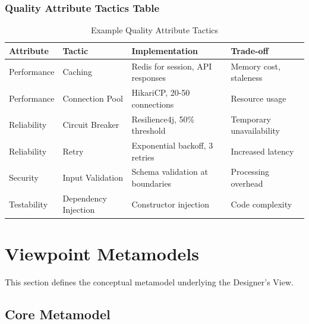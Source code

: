 \documentclass[11pt,letterpaper]{article}
\begin{document}
\subsubsection{Quality Attribute Tactics Table}

\begin{table}[H]
\centering
\caption{Example Quality Attribute Tactics}
\small
\begin{tabular}{@{}L{2cm}L{2.5cm}L{4cm}L{3.5cm}@{}}
\toprule
\textbf{Attribute} & \textbf{Tactic} & \textbf{Implementation} & \textbf{Trade-off} \\
\midrule
Performance & Caching & Redis for session, API responses & Memory cost, staleness \\
\addlinespace
Performance & Connection Pool & HikariCP, 20-50 connections & Resource usage \\
\addlinespace
Reliability & Circuit Breaker & Resilience4j, 50\% threshold & Temporary unavailability \\
\addlinespace
Reliability & Retry & Exponential backoff, 3 retries & Increased latency \\
\addlinespace
Security & Input Validation & Schema validation at boundaries & Processing overhead \\
\addlinespace
Testability & Dependency Injection & Constructor injection & Code complexity \\
\bottomrule
\end{tabular}
\end{table}

\section{Viewpoint Metamodels}

This section defines the conceptual metamodel underlying the Designer's View.

\subsection{Core Metamodel}
\end{document}
